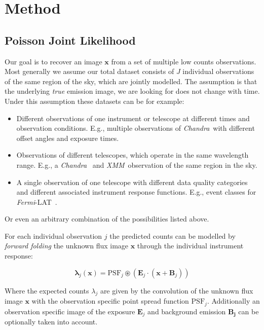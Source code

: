 \documentclass[twocolumn]{aastex631}
\newcommand{\chandra}{\textit{Chandra}~}
\newcommand{\xmm}{\textit{XMM}~}
\newcommand{\fermi}{\textit{Fermi}-LAT~}
\begin{document}
   

    

    \section{Method}
    \subsection{Poisson Joint Likelihood}
    Our goal is to recover an image $\mathbf{x}$ from a set of multiple low counts observations. Most generally we assume our total dataset consists of $J$ individual observations of the same region of the sky, which are jointly modelled. The assumption is that the underlying \textit{true} emission image, we are looking for does not change with time. Under this assumption these datasets can be for example:

    \begin{itemize}
        \item Different observations of one instrument or telescope at different times and observation conditions. E.g., multiple observations of \chandra with different offset angles and exposure times.
        \item Observations of different telescopes, which operate in the same wavelength range. E.g., a \chandra
        and \xmm observation of the same region in the sky.
        \item A single observation of one telescope with different data quality categories and different associated instrument
        response functions. E.g., event classes for \fermi.
    \end{itemize}

    Or even an arbitrary combination of the possibilities listed above. 
    
    For each individual observation $j$ the predicted counts can be modelled by \textit{forward folding} the unknown flux image $\mathbf{x}$ through the individual instrument response:

    \begin{equation}
        \label{eq:model}
        \boldsymbol{\lambda}_j(\mathbf{x}) = \mathrm{PSF}_j \circledast \left(\mathbf{E}_j \cdot (\mathbf{x} + \mathbf{B}_j) \right)
    \end{equation}

    Where the expected counts $\lambda_j$ are given by the convolution of the unknown 
    flux image $\mathbf{x}$ with the observation specific point spread function $\mathrm{PSF}_j$. Additionally
    an observation specific image of the exposure $\mathbf{E}_j$ and background emission $\mathbf{B_j}$ can be
    optionally taken into account.
\end{document}
